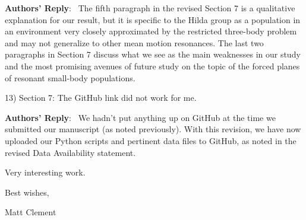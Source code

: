 \documentclass[11pt]{article}
\newcounter{reviewer}
\newcounter{point}[reviewer]
\newenvironment{reply}
   {\medskip \noindent \begin{sf}\textbf{Authors' Reply}:\  }
   {\medskip \end{sf}\medskip}
\begin{document}
\begin{reply}
The fifth paragraph in the revised Section 7 is a qualitative explanation for our result, but it is specific to the Hilda group as a population in an environment very closely approximated by the restricted three-body problem and may not generalize to other mean motion resonances.
The last two paragraphs in Section 7 discuss what we see as the main weaknesses in our study and the most promising avenues of future study on the topic of the forced planes of resonant small-body populations.
\end{reply}

13) Section 7: The GitHub link did not work for me.

\begin{reply}
We hadn't put anything up on GitHub at the time we submitted our manuscript (as noted previously). 
With this revision, we have now uploaded our Python scripts and pertinent data files to GitHub, as noted in the revised Data Availability statement.
\end{reply}

Very interesting work.

Best wishes,

Matt Clement

%



\end{document}
